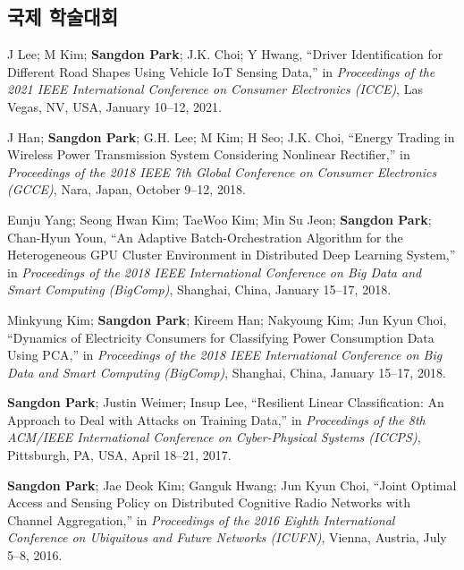 \documentclass[11pt,a4paper]{article}
\begin{document}
\subsection{국제 학술대회}

\begin{enumerate}[label={[{\arabic*}]}, leftmargin=*, itemsep=0.3em]

\item J Lee; M Kim; \textbf{Sangdon Park}; J.K. Choi; Y Hwang, ``Driver Identification for Different Road Shapes Using Vehicle IoT Sensing Data,'' in \textit{Proceedings of the 2021 IEEE International Conference on Consumer Electronics (ICCE)}, Las Vegas, NV, USA, January 10--12, 2021.

\item J Han; \textbf{Sangdon Park}; G.H. Lee; M Kim; H Seo; J.K. Choi, ``Energy Trading in Wireless Power Transmission System Considering Nonlinear Rectifier,'' in \textit{Proceedings of the 2018 IEEE 7th Global Conference on Consumer Electronics (GCCE)}, Nara, Japan, October 9--12, 2018.

\item Eunju Yang; Seong Hwan Kim; TaeWoo Kim; Min Su Jeon; \textbf{Sangdon Park}; Chan-Hyun Youn, ``An Adaptive Batch-Orchestration Algorithm for the Heterogeneous GPU Cluster Environment in Distributed Deep Learning System,'' in \textit{Proceedings of the 2018 IEEE International Conference on Big Data and Smart Computing (BigComp)}, Shanghai, China, January 15--17, 2018.

\item Minkyung Kim; \textbf{Sangdon Park}; Kireem Han; Nakyoung Kim; Jun Kyun Choi, ``Dynamics of Electricity Consumers for Classifying Power Consumption Data Using PCA,'' in \textit{Proceedings of the 2018 IEEE International Conference on Big Data and Smart Computing (BigComp)}, Shanghai, China, January 15--17, 2018.

\item \textbf{Sangdon Park}; Justin Weimer; Insup Lee, ``Resilient Linear Classification: An Approach to Deal with Attacks on Training Data,'' in \textit{Proceedings of the 8th ACM/IEEE International Conference on Cyber-Physical Systems (ICCPS)}, Pittsburgh, PA, USA, April 18--21, 2017.

\item \textbf{Sangdon Park}; Jae Deok Kim; Ganguk Hwang; Jun Kyun Choi, ``Joint Optimal Access and Sensing Policy on Distributed Cognitive Radio Networks with Channel Aggregation,'' in \textit{Proceedings of the 2016 Eighth International Conference on Ubiquitous and Future Networks (ICUFN)}, Vienna, Austria, July 5--8, 2016.


\end{enumerate}
\end{document}
